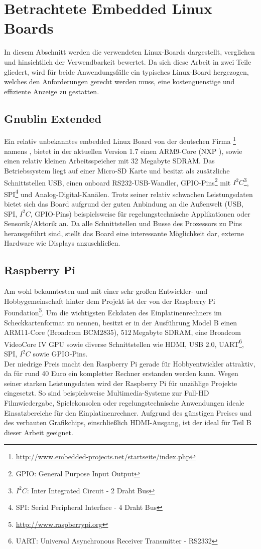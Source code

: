 \section{Betrachtete Embedded Linux Boards}
\label{cha:betrachtete_linux_boards}
In diesem Abschnitt werden die verwendeten Linux-Boards dargestellt, verglichen und hinsichtlich der Verwendbarkeit bewertet. Da sich diese Arbeit in zwei Teile gliedert, wird für beide Anwendungsfälle ein typisches Linux-Board hergezogen, welches den Anforderungen gerecht werden muss, eine kostenguenstige und effiziente Anzeige zu gestatten.
\subsection{Gnublin Extended}
\label{cha:gnublin_extended}
Ein relativ unbekanntes embedded Linux Board von der deutschen Firma \footnote{\url{http://www.embedded-projects.net/startseite/index.php}} namens , bietet in der aktuellen Version 1.7 einen ARM9-Core (NXP ), sowie einen relativ kleinen Arbeitsspeicher mit 32 Megabyte SDRAM. Das Betriebssystem liegt auf einer Micro-SD Karte und besitzt als zusätzliche Schnittstellen USB, einen onboard RS232-USB-Wandler, GPIO-Pins\footnote{GPIO: General Purpose Input Output} mit $I^2C$\footnote{$I^2C$: Inter Integrated Circuit - 2 Draht Bus}, SPI\footnote{SPI: Serial Peripheral Interface - 4 Draht Bus} und Analog-Digital-Kanälen. Trotz seiner relativ schwachen Leistungsdaten bietet sich das Board aufgrund der guten Anbindung an die Außenwelt (USB, SPI, $I^2C$, GPIO-Pins) beispielsweise für regelungstechnische Applikationen oder Sensorik/Aktorik an.
Da alle Schnittstellen und Busse des Prozessors zu Pins herausgeführt sind, stellt das Board eine interessante Möglichkeit dar, externe Hardware wie Displays anzuschließen. 
\subsection{Raspberry Pi}
\label{cha:raspberry}
Am wohl bekanntesten und mit einer sehr großen Entwickler- und Hobbygemeinschaft hinter dem Projekt ist der  von der Raspberry Pi Foundation\footnote{\url{http://www.raspberrypi.org}}. Um die wichtigsten Eckdaten des Einplatinenrechners im Scheckkartenformat zu nennen, besitzt er in der Ausführung Model B einen ARM11-Core (Broadcom BCM2835), 512\,Megabyte SDRAM, eine Broadcom VideoCore IV GPU sowie diverse Schnittstellen wie HDMI, USB 2.0, UART\footnote{UART: Universal Asynchronous Receiver Transmitter - RS2332}, SPI, $I^2C$ sowie GPIO-Pins.\\
Der niedrige Preis macht den Raspberry Pi gerade für Hobbyentwickler attraktiv, da für rund 40 Euro ein kompletter Rechner erstanden werden kann. Wegen seiner starken Leistungsdaten wird der Raspberry Pi für unzählige Projekte eingesetzt. So sind beispielsweise Multimedia-Systeme zur Full-HD Filmwiedergabe, Spielekonsolen oder regelungstechnische Anwendungen ideale Einsatzbereiche für den Einplatinenrechner.
Aufgrund des günstigen Preises und des verbauten Grafikchips, einschließlich HDMI-Ausgang, ist der  ideal für Teil B dieser Arbeit geeignet.